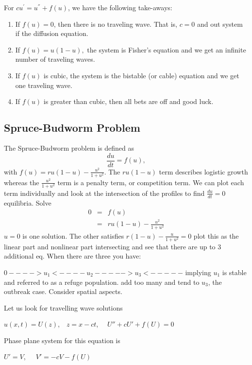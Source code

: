 \documentclass[]{article}
\numberwithin{equation}{section}		%
\def\bea{\begin{eqnarray}}
\def\ena{\end{eqnarray}}
\begin{document}
For $cu^{'}=u^{''}+f(u)$, we have the following take-aways:
\begin{enumerate}
\item If $f(u)=0$, then there is no traveling wave. That is, $c=0$ and out system if the diffusion equation.
\item If $f(u)=u(1-u),$ the system is Fisher's equation and we get an infinite number of traveling waves. 
\item If $f(u)$ is cubic, the system is the bistable (or cable) equation and we get one traveling wave.
\item If $f(u)$ is greater than cubic, then all bets are off and good luck.
\end{enumerate}


\subsection{Spruce-Budworm Problem}
The Spruce-Budworm problem is defined as
\begin{equation}
\frac{du}{dt}=f(u),
\end{equation}
with $f(u)=ru(1-u)-\frac{u^2}{1+u^2}$. The $ru(1-u)$ term describes logistic growth whereas the $\frac{u^2}{1+u^2}$ term is a penalty term, or competition term. We can plot each term individually and look at the intersection of the profiles to find $\frac{du}{dt}=0$ equilibria. 
Solve 
\bea
0 &=& f(u) \nonumber \\
&=& ru(1-u)-\frac{u^2}{1+u^2} \nonumber
\ena
$u=0$ is one solution. The other satisfies $r(1-u)-\frac{u}{1+u^2}=0$
plot this as the linear part and nonlinear part intersecting and see that there are up to 3 additional eq. When there are three you have:

$0 ---->u_1<----u_2----->u_3<-----$ implying $u_1$ is stable and referred to as a refuge population. add too many and tend to $u_3$, the outbreak case. Consider spatial aspects.

\noindent Let us look for travelling wave solutions

\begin{center}
$u(x, t) = U(z)$,\ \ $ z = x - ct $, \ \ $ U''+cU'+ f (U) = 0$\\
\end{center}

\noindent Phase plane system for this equation is

\begin{center}
$U'= V$,\ \ \ $ V'=-cV - f (U)$ \\
\end{center}
\end{document}
